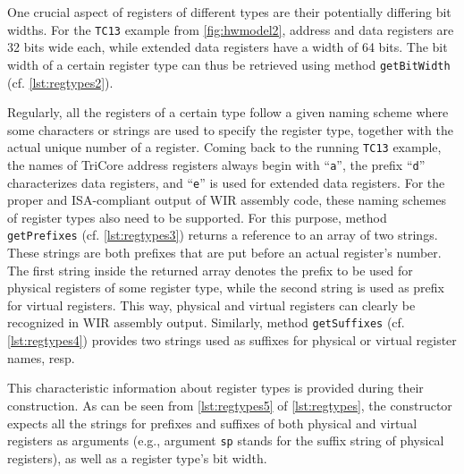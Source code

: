 One crucial aspect of registers of different types are their potentially differing bit widths.
For the \texttt{TC13} example from \cref{fig:hwmodel2}, address and data registers are 32 bits wide each, while extended data registers have a width of 64 bits.
The bit width of a certain register type can thus be retrieved using method \texttt{getBitWidth} (cf. \cref{lst:regtypes2}).

Regularly, all the registers of a certain type follow a given naming scheme where some characters or strings are used to specify the register type, together with the actual unique number of a register.
Coming back to the running \texttt{TC13} example, the names of TriCore address registers always begin with ``\texttt{a}'', the prefix ``\texttt{d}'' characterizes data registers, and ``\texttt{e}'' is used for extended data registers.
For the proper and \gls{ISA}-compliant output of \gls{WIR} assembly code, these naming schemes of register types also need to be supported.
For this purpose, method \texttt{getPrefixes} (cf. \cref{lst:regtypes3}) returns a reference to an array of two strings.
These strings are both prefixes that are put before an actual register's number.
The first string inside the returned array denotes the prefix to be used for physical registers of some register type, while the second string is used as prefix for virtual registers.
This way, physical and virtual registers can clearly be recognized in \gls{WIR} assembly output.
Similarly, method \texttt{getSuffixes} (cf. \cref{lst:regtypes4}) provides two strings used as suffixes for physical or virtual register names, resp.

This characteristic information about register types is provided during their construction.
As can be seen from \cref{lst:regtypes5} of \cref{lst:regtypes}, the constructor expects all the strings for prefixes and suffixes of both physical and virtual registers as arguments (e.g., argument \texttt{sp} stands for the suffix string of physical registers), as well as a register type's bit width.

